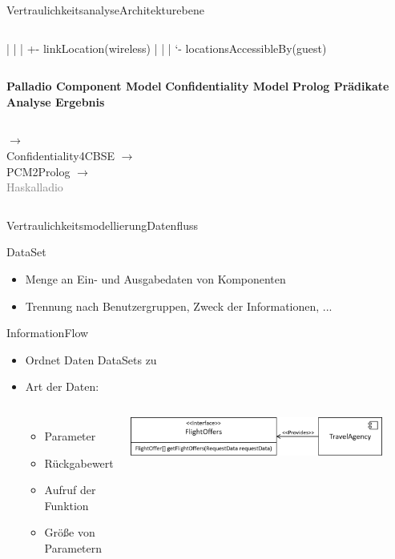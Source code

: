 \documentclass{sdqbeamer}
\begin{document}
\begin{frame}{Vertraulichkeitsanalyse}{Architekturebene}
\begin{columns}[c]
{| | | +- linkLocation(wireless)
| | | ‘- locationsAccessibleBy(guest)}
\end{columns}
\begin{columns}\centering
	\centering
	\textbf{Palladio Component Model}
	\vspace{0.05\textheight}
	\centering
	\textbf{Confidentiality Model}
	\centering
	\textbf{Prolog Prädikate}
	\centering
	\textbf{Analyse Ergebnis}
\end{columns}
\begin{columns}\centering
{}
\centering
$\longrightarrow$ \\
Confidentiality4CBSE\footnotemark[1]
\centering
$\longrightarrow $\\
PCM2Prolog\footnotemark[2]
\centering
$\longrightarrow$ \\
\textcolor{gray}{Haskalladio}
\end{columns}
\end{frame}	


\begin{frame}{Vertraulichkeitsmodellierung}{Datenfluss}

	DataSet
	\begin{itemize}
		\item Menge an Ein- und Ausgabedaten von Komponenten
		\item Trennung nach Benutzergruppen, Zweck der Informationen, ...
	\end{itemize}
	\vspace{0.05\textheight}
	InformationFlow
		\begin{itemize}
			\item Ordnet Daten DataSets zu
			\item Art der Daten:
			\begin{columns}
				\begin{itemize}
					\item Parameter
					\item Rückgabewert
					\item Aufruf der Funktion
					\item Größe von Parametern
				\end{itemize}
				\includegraphics[width=0.9\textwidth]{images/interface.png}
				\vspace{0.05\textheight}
			\end{columns}
		\end{itemize}
\end{frame}
	
\end{document}
